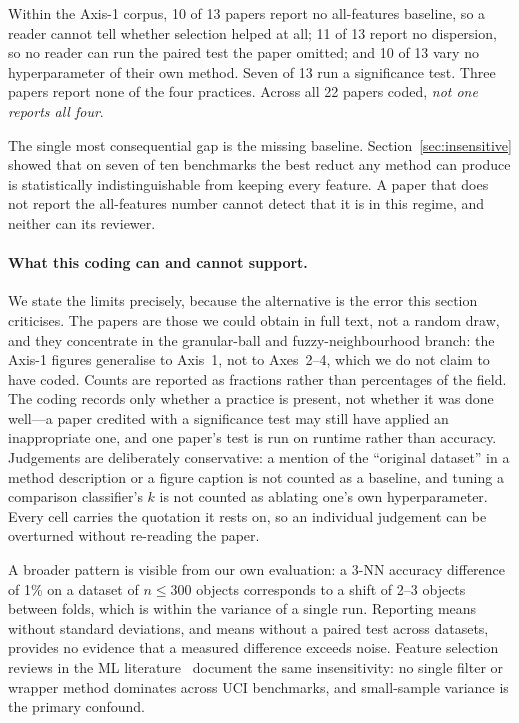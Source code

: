 Within the Axis-1 corpus, 10 of 13 papers report no all-features baseline, so
a reader cannot tell whether selection helped at all; 11 of 13 report no
dispersion, so no reader can run the paired test the paper omitted; and 10 of
13 vary no hyperparameter of their own method.  Seven of 13 run a
significance test.  Three papers report none of the four practices.  Across all 22 papers
coded, \emph{not one reports all four}.

The single most consequential gap is the missing baseline.  Section~\ref{sec:insensitive}
showed that on seven of ten benchmarks the best reduct any method can produce
is statistically indistinguishable from keeping every feature.  A paper that
does not report the all-features number cannot detect that it is in this
regime, and neither can its reviewer.

\paragraph{What this coding can and cannot support.}
We state the limits precisely, because the alternative is the error this
section criticises.  The papers are those we could obtain in full text, not a
random draw, and they concentrate in the granular-ball and fuzzy-neighbourhood
branch: the Axis-1 figures generalise to Axis~1, not to Axes~2--4, which we do
not claim to have coded.  Counts are reported as fractions rather than
percentages of the field.  The coding records only whether a practice is
present, not whether it was done well---a paper credited with a significance
test may still have applied an inappropriate one, and one paper's test is run
on runtime rather than accuracy.  Judgements are deliberately conservative:
a mention of the ``original dataset'' in a method description or a figure
caption is not counted as a baseline, and tuning a comparison classifier's
$k$ is not counted as ablating one's own hyperparameter.  Every cell carries
the quotation it rests on, so an individual judgement can be overturned
without re-reading the paper.

A broader pattern is visible from our own evaluation: a 3-NN accuracy
difference of 1\% on a dataset of $n \leq 300$ objects corresponds to a
shift of 2--3 objects between folds, which is within the variance of a
single run.  Reporting means without standard deviations, and means without
a paired test across datasets, provides no evidence that a measured difference
exceeds noise.  Feature selection reviews in the ML literature~\cite{Saeys2007}
document the same insensitivity: no single filter or wrapper method dominates
across UCI benchmarks, and small-sample variance is the primary confound.

